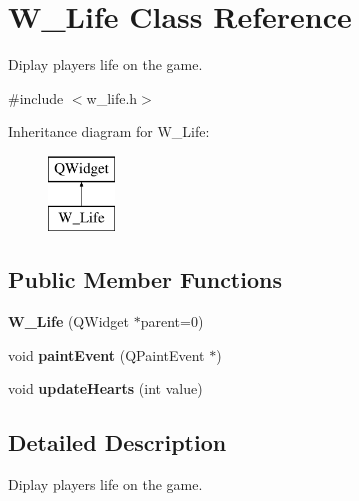 \hypertarget{class_w___life}{}\section{W\+\_\+\+Life Class Reference}
\label{class_w___life}


Diplay player\textquotesingle{}s life on the game.  




{\ttfamily \#include $<$w\+\_\+life.\+h$>$}

Inheritance diagram for W\+\_\+\+Life\+:\begin{figure}[H]
\begin{center}
\leavevmode
\includegraphics[height=2.000000cm]{class_w___life}
\end{center}
\end{figure}
\subsection*{Public Member Functions}
\begin{DoxyCompactItemize}
\item 
\hypertarget{class_w___life_a25c76c113cc194318573f11ac513f391}{}{\bfseries W\+\_\+\+Life} (Q\+Widget $\ast$parent=0)\label{class_w___life_a25c76c113cc194318573f11ac513f391}

\item 
\hypertarget{class_w___life_acfe041331828447c6667e3bad64fd357}{}void {\bfseries paint\+Event} (Q\+Paint\+Event $\ast$)\label{class_w___life_acfe041331828447c6667e3bad64fd357}

\item 
\hypertarget{class_w___life_aa07fc1f57cac5cd100fed66e4924b643}{}void {\bfseries update\+Hearts} (int value)\label{class_w___life_aa07fc1f57cac5cd100fed66e4924b643}

\end{DoxyCompactItemize}


\subsection{Detailed Description}
Diplay player\textquotesingle{}s life on the game. 

